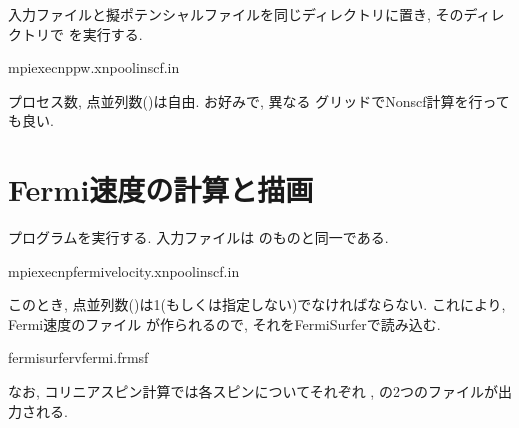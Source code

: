 \documentclass[letterpaper,10pt,dvipdfmx,openany]{sphinxmanual}
\begin{document}
\sphinxAtStartPar
入力ファイルと擬ポテンシャルファイルを同じディレクトリに置き,
そのディレクトリで  を実行する.

\begin{sphinxVerbatim}[commandchars=\\\{\}]
\PYGZdl{}mpiexec\PYGZhy{}nppw.x\PYGZhy{}npool\PYGZhy{}inscf.in
\end{sphinxVerbatim}

\sphinxAtStartPar
プロセス数,  点並列数()は自由.
お好みで, 異なる  グリッドでNon\sphinxhyphen{}scf計算を行っても良い.


\section{Fermi速度の計算と描画}
\label{\detokenize{qe:fermi}}
\sphinxAtStartPar
{} プログラムを実行する.
入力ファイルは  のものと同一である.

\begin{sphinxVerbatim}[commandchars=\\\{\}]
\PYGZdl{}mpiexec\PYGZhy{}npfermi\PYGZus{}velocity.x\PYGZhy{}npool\PYGZhy{}inscf.in
\end{sphinxVerbatim}

\sphinxAtStartPar
このとき,  点並列数()は1(もしくは指定しない)でなければならない.
これにより, Fermi速度のファイル  が作られるので,
それをFermiSurferで読み込む.

\begin{sphinxVerbatim}[commandchars=\\\{\}]
\PYGZdl{}fermisurfervfermi.frmsf
\end{sphinxVerbatim}

\begin{figure}[htbp]
\centering

\noindent{}
\end{figure}

\sphinxAtStartPar
なお, コリニアスピン計算では各スピンについてそれぞれ , 
の2つのファイルが出力される.
\end{document}
